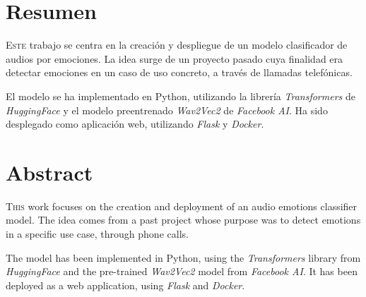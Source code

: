 \chapter*{Resumen}
\pagestyle{especial}
{}

\lettrine[lraise=-0.1, lines=2, loversize=0.2]{E}{ste} trabajo se centra en la creación y despliegue de un modelo clasificador de audios por emociones.
La idea surge de un proyecto pasado cuya finalidad era detectar emociones en un caso de uso concreto, a través de llamadas telefónicas.

El modelo se ha implementado en Python, utilizando la librería  \textit{Transformers} de \textit{HuggingFace} y el modelo preentrenado \textit{Wav2Vec2} de \textit{Facebook AI}.
Ha sido desplegado como aplicación web, utilizando \textit{Flask} y \textit{Docker}.



\chapter*{Abstract}
\pagestyle{especial}
{}

\lettrine[lraise=-0.1, lines=2, loversize=0.2]{T}{his} work focuses on the creation and deployment of an audio emotions classifier model.
The idea comes from a past project whose purpose was to detect emotions in a specific use case, through phone calls.

The model has been implemented in Python, using the \textit{Transformers} library from \textit{HuggingFace} and the pre-trained \textit{Wav2Vec2} model from \textit{Facebook AI}.
It has been deployed as a web application, using \textit{Flask} and \textit{Docker}.

\endinput
